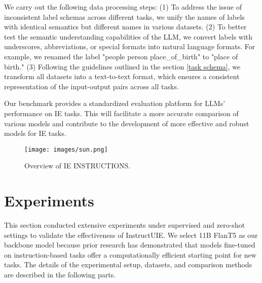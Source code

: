 \documentclass[11pt]{article}
\begin{document}
We carry out the following data processing steps: (1) To address the issue of inconsistent label schemas across different tasks, we unify the names of labels with identical semantics but different names in various datasets. (2) To better test the semantic understanding capabilities of the LLM, we convert labels with underscores, abbreviations, or special formats into natural language formats. For example, we renamed the label "people person place\_of\_birth" to "place of birth." (3) Following the guidelines outlined in the section \ref{task schema}, we transform all datasets into a text-to-text format, which ensures a consistent representation of the input-output pairs across all tasks.

Our benchmark provides a standardized evaluation platform for LLMs' performance on IE tasks. This will facilitate a more accurate comparison of various models and contribute to the development of more effective and robust models for IE tasks.

\begin{figure}[t]
\small
\centering
  \texttt{[image: images/sun.png]}
  \caption{Overview of IE INSTRUCTIONS.}
 \label{benchmark_sun}
\end{figure}


\section{Experiments}
This section conducted extensive experiments under supervised and zero-shot settings to validate the effectiveness of InstructUIE. 
We select 11B FlanT5 \cite{chung2022scaling} as our backbone model because prior research \cite{Longpre2023TheFC} has demonstrated that models fine-tuned on instruction-based tasks offer a computationally efficient starting point for new tasks.
The details of the experimental setup, datasets, and comparison methods are described in the following parts.
\end{document}
